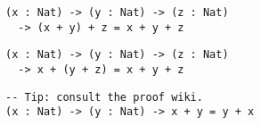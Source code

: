 \begin{frame}[fragile]

\begin{lstlisting}[frame=single]
(x : Nat) -> (y : Nat) -> (z : Nat)
  -> (x + y) + z = x + y + z
\end{lstlisting}

\begin{lstlisting}[frame=single]
(x : Nat) -> (y : Nat) -> (z : Nat)
  -> x + (y + z) = x + y + z
\end{lstlisting}

\begin{lstlisting}[frame=single]
-- Tip: consult the proof wiki.
(x : Nat) -> (y : Nat) -> x + y = y + x
\end{lstlisting}

\end{frame}
